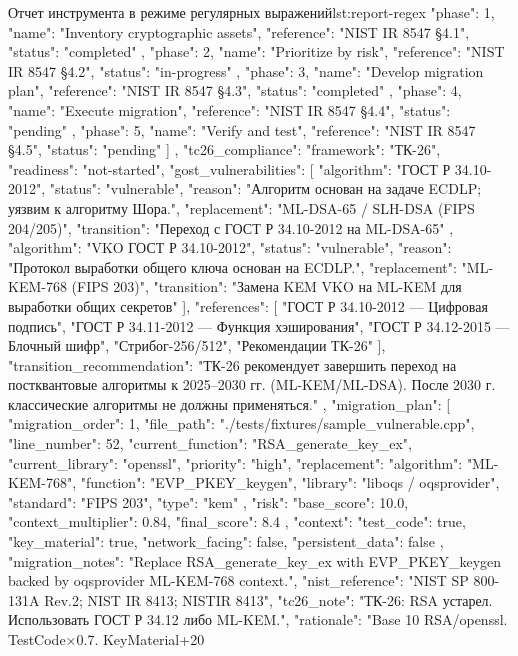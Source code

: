 \documentclass{itmo-vkr}
\begin{document}
\begin{itmolisting}[JSON]{Отчет инструмента в режиме регулярных выражений}{lst:report-regex}
{{			{
				"phase": 1,
				"name": "Inventory cryptographic assets",
				"reference": "NIST IR 8547 §4.1",
				"status": "completed"
			},
			{
				"phase": 2,
				"name": "Prioritize by risk",
				"reference": "NIST IR 8547 §4.2",
				"status": "in-progress"
			},
			{
				"phase": 3,
				"name": "Develop migration plan",
				"reference": "NIST IR 8547 §4.3",
				"status": "completed"
			},
			{
				"phase": 4,
				"name": "Execute migration",
				"reference": "NIST IR 8547 §4.4",
				"status": "pending"
			},
			{
				"phase": 5,
				"name": "Verify and test",
				"reference": "NIST IR 8547 §4.5",
				"status": "pending"
			}
			]
		},
		"tc26_compliance": {
			"framework": "ТК-26",
			"readiness": "not-started",
			"gost_vulnerabilities": [
			{
				"algorithm": "ГОСТ Р 34.10-2012",
				"status": "vulnerable",
				"reason": "Алгоритм основан на задаче ECDLP; уязвим к алгоритму Шора.",
				"replacement": "ML-DSA-65 / SLH-DSA (FIPS 204/205)",
				"transition": "Переход с ГОСТ Р 34.10-2012 на ML-DSA-65"
			},
			{
				"algorithm": "VKO ГОСТ Р 34.10-2012",
				"status": "vulnerable",
				"reason": "Протокол выработки общего ключа основан на ECDLP.",
				"replacement": "ML-KEM-768 (FIPS 203)",
				"transition": "Замена KEM VKO на ML-KEM для выработки общих секретов"
			}
			],
			"references": [
			"ГОСТ Р 34.10-2012 — Цифровая подпись",
			"ГОСТ Р 34.11-2012 — Функция хэширования",
			"ГОСТ Р 34.12-2015 — Блочный шифр",
			"Стрибог-256/512",
			"Рекомендации ТК-26"
			],
			"transition_recommendation": "ТК-26 рекомендует завершить переход на постквантовые алгоритмы к 2025–2030 гг. (ML-KEM/ML-DSA). После 2030 г. классические алгоритмы не должны применяться."
		},
		"migration_plan": [
		{
			"migration_order": 1,
			"file_path": "./tests/fixtures/sample_vulnerable.cpp",
			"line_number": 52,
			"current_function": "RSA_generate_key_ex",
			"current_library": "openssl",
			"priority": "high",
			"replacement": {
				"algorithm": "ML-KEM-768",
				"function": "EVP_PKEY_keygen",
				"library": "liboqs / oqsprovider",
				"standard": "FIPS 203",
				"type": "kem"
			},
			"risk": {
				"base_score": 10.0,
				"context_multiplier": 0.84,
				"final_score": 8.4
			},
			"context": {
				"test_code": true,
				"key_material": true,
				"network_facing": false,
				"persistent_data": false
			},
			"migration_notes": "Replace RSA_generate_key_ex with EVP_PKEY_keygen backed by oqsprovider ML-KEM-768 context.",
			"nist_reference": "NIST SP 800-131A Rev.2; NIST IR 8413; NISTIR 8413",
			"tc26_note": "ТК-26: RSA устарел. Использовать ГОСТ Р 34.12 либо ML-KEM.",
			"rationale": "Base 10 RSA/openssl. TestCode×0.7. KeyMaterial+20%
}}
\end{itmolisting}
\end{document}
